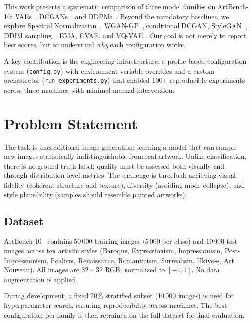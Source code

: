 \documentclass[runningheads]{llncs}
\begin{document}
This work presents a systematic comparison of three model families on ArtBench-10: VAEs~\cite{kingma2013}, DCGANs~\cite{radford2015}, and DDPMs~\cite{ho2020}. Beyond the mandatory baselines, we explore Spectral Normalization~\cite{miyato2018}, WGAN-GP~\cite{gulrajani2017}, conditional DCGAN, StyleGAN~\cite{karras2018}, DDIM sampling~\cite{song2020}, EMA, CVAE, and VQ-VAE~\cite{oord2017}. Our goal is not merely to report best scores, but to understand \emph{why} each configuration works.

A key contribution is the engineering infrastructure: a profile-based configuration system (\texttt{config.py}) with environment variable overrides and a custom orchestrator (\texttt{run\_experiments.py}) that enabled 100+ reproducible experiments across three machines with minimal manual intervention.

\section{Problem Statement}\label{sec:problem}

The task is unconditional image generation: learning a model that can sample new images statistically indistinguishable from real artwork. Unlike classification, there is no ground-truth label; quality must be assessed both visually and through distribution-level metrics. The challenge is threefold: achieving visual fidelity (coherent structure and texture), diversity (avoiding mode collapse), and style plausibility (samples should resemble painted artworks).

\subsection{Dataset}

ArtBench-10~\cite{liao2022} contains 50\,000 training images (5\,000 per class) and 10\,000 test images across ten artistic styles (Baroque, Expressionism, Impressionism, Post-Impressionism, Realism, Renaissance, Romanticism, Surrealism, Ukiyo-e, Art Nouveau). All images are $32 \times 32$ RGB, normalized to $[-1, 1]$. No data augmentation is applied.

During development, a fixed 20\% stratified subset (10\,000 images) is used for hyperparameter search, ensuring reproducibility across machines. The best configuration per family is then retrained on the full dataset for final evaluation.

\end{document}
